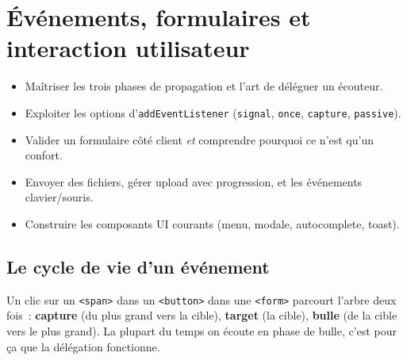 \documentclass[12pt,a4paper,twoside,openright]{book}
\begin{document}
\chapter{\'Ev\'enements, formulaires et interaction utilisateur}
\label{ch-js-events}

\begin{objectif}
\begin{itemize}
  \item Ma\^itriser les trois phases de propagation et l'art de d\'el\'eguer un \'ecouteur.
  \item Exploiter les options d'\texttt{addEventListener} (\texttt{signal}, \texttt{once},
        \texttt{capture}, \texttt{passive}).
  \item Valider un formulaire c\^ot\'e client \emph{et} comprendre pourquoi ce n'est qu'un confort.
  \item Envoyer des fichiers, g\'erer upload avec progression, et les \'ev\'enements clavier/souris.
  \item Construire les composants UI courants (menu, modale, autocomplete, toast).
\end{itemize}
\end{objectif}

\section{Le cycle de vie d'un \'ev\'enement}

Un clic sur un \verb|<span>| dans un \verb|<button>| dans une \verb|<form>| parcourt l'arbre
deux fois~: \textbf{capture} (du plus grand vers la cible), \textbf{target} (la cible),
\textbf{bulle} (de la cible vers le plus grand). La plupart du temps on \'ecoute en phase de
bulle, c'est pour \c{c}a que la d\'el\'egation fonctionne.
\end{document}
